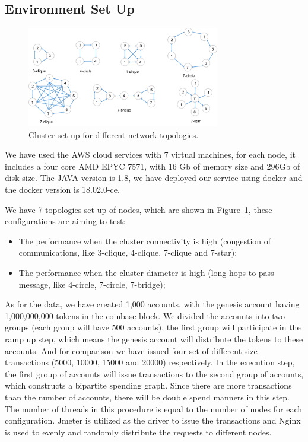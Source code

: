 \subsection {Environment Set Up}

\begin{figure}[!ht]
\begin{center}
\includegraphics[width=0.75\textwidth]{figures/cluster_set_up.pdf}
    \caption{
        Cluster set up for different network topologies.
     }
\label{cluster_set_up}
\end{center}
\end{figure}

We have used the AWS cloud services with 7 virtual machines, for each node, it includes a four core AMD EPYC 7571, with 16 Gb of memory size and 296Gb of disk size. 
The JAVA version is 1.8, we have deployed our service using docker and the docker version is 18.02.0-ce.   

We have 7 topologies set up of nodes, which are shown in Figure~\ref{cluster_set_up}, these configurations are aiming to test: 
\begin{itemize}
    \item The performance when the cluster connectivity is high (congestion of communications, like 3-clique, 4-clique, 7-clique and 7-star);
    \item The performance when the cluster diameter is high (long hops to pass message, like 4-circle, 7-circle, 7-bridge);
\end{itemize}

As for the data, we have created 1,000 accounts, with the genesis account having 1,000,000,000 tokens in the coinbase block.
We divided the accounts into two groups (each group will have 500 accounts), the first group will participate in the ramp up step, which means the genesis account will distribute the tokens to these accounts.
And for comparison we have issued four set of different size transactions (5000, 10000, 15000 and 20000) respectively.
In the execution step, the first group of accounts will issue transactions to the second group of accounts, which constructs a bipartite spending graph. 
Since there are more transactions than the number of accounts, there will be double spend manners in this step.
The number of threads in this procedure is equal to the number of nodes for each configuration.
Jmeter \cite{halili2008apache} is utilized as the driver to issue the transactions and 
Nginx \cite{nedelcu2010nginx} is used to evenly and randomly distribute the requests to different nodes.

